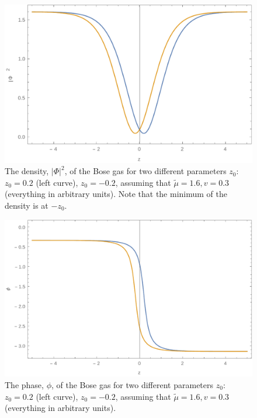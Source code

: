 \documentclass[twocolumn,amsmath,amssymb,showpacs,prl,superscriptaddress,aps]{revtex4-1}
\begin{document}
\begin{figure}
\centerline{\includegraphics[scale=0.5]{density.pdf}}
\caption{The density, $|\Phi|^2$, of the Bose gas for two different parameters $z_0$: $z_0=0.2$ (left curve), $z_0=-0.2$, assuming that $\tilde \mu=1.6, v=0.3$ (everything in arbitrary units). 
Note that the minimum of the density is at $-z_0$.}
\label{fig:Fig1}
\end{figure}

\begin{figure}
\centerline{\includegraphics[scale=0.5]{phase.pdf}}
\caption{The phase, $\phi$, of the Bose gas for two different parameters $z_0$: $z_0=0.2$ (left curve), $z_0=-0.2$, assuming that $\tilde \mu=1.6, v=0.3$ (everything in arbitrary units).}
\label{fig:Fig2}
\end{figure}
\end{document}
